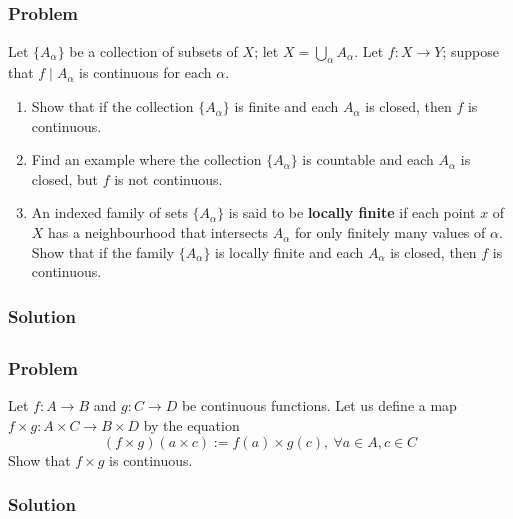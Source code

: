 
\subsection{}

\subsubsection{Problem}
Let $\{ A_\alpha \}$ be a collection of subsets of $X$; let $X = \bigcup_\alpha A_\alpha$. Let $f : X \to Y$; suppose that $f \mid A_\alpha$ is continuous for each $\alpha$.
\begin{enumerate}
    \item Show that if the collection $\{A_\alpha\}$ is finite and each $A_\alpha$ is closed, then $f$ is continuous.
    \item Find an example where the collection $\{A_\alpha\}$ is countable and each $A_\alpha$ is closed, but $f$ is not continuous.
    \item An indexed family of sets $\{A_\alpha\}$ is said to be \textbf{locally finite} if each point $x$ of $X$ has a neighbourhood that intersects $A_\alpha$ for only finitely many values of $\alpha$. Show that if the family $\{A_\alpha\}$ is locally finite and each $A_\alpha$ is closed, then $f$ is continuous.
\end{enumerate}

\subsubsection{Solution}
\todo


\subsection{}

\subsubsection{Problem}
Let $f : A \to B$ and $g : C \to D$ be continuous functions. Let us define a map $f \times g : A \times C \to B \times D$ by the equation
\[ (f \times g)(a \times c) := f(a) \times g(c),~ \forall a \in A, c \in C \]
Show that $f \times g$ is continuous.

\subsubsection{Solution}
\todo

